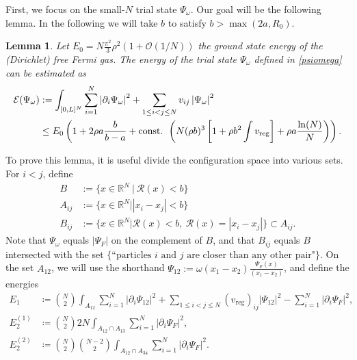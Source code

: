 \documentclass[a4paper,11pt]{article}
\newcommand{\abs}[1]{\left\lvert #1 \right\rvert}
\newcommand{\R}{\mathbb{R}}
\newcommand{\rr}{\mathcal{R}}
\newtheorem{lemma}[theorem]{Lemma}
\numberwithin{equation}{section}
\begin{document}
First, we focus on the small-$N$ trial state $\Psi_\omega$. Our goal will be the following lemma. In the following we will take $b$ to satisfy $b>\max(2a,R_0)$.
	\begin{lemma}
	\label{LemmaUpperBoundFewParticles}
	Let $E_0=N\frac{\pi^2}{3}\rho^2(1+\mathcal{O}(1/N)) $ the ground state energy of the (Dirichlet) free Fermi gas. The energy of the trial state $\Psi_\omega$ defined in \eqref{psiomega} can be estimated as 
	    \begin{equation}
	    \begin{aligned}
	        \mathcal{E}(\Psi_\omega)&:=\int_{[0,L]^N} \sum_{i=1}^{N}\abs{\partial_i\Psi_\omega}^2+\sum_{1\leq i<j\leq N}v_{ij}\abs{\Psi_\omega}^2\\
	        &\leq E_0\left(1+2\rho a\frac{b}{b-a}+\textnormal{const. } \left(N(\rho b)^3\left[1+\rho b^2\int v_\textnormal{reg}\right]+\rho a \frac{\ln(N)}{N}\right)\right).
	    \end{aligned}
	    \end{equation}
	\end{lemma}
To prove this lemma, it is useful divide the configuration space into various sets. For $i<j$, define 
\begin{equation}
\begin{aligned}
B&:=\{x\in\R^N\ \vert\ \mathcal{R}(x)<b \}\\
A_{ij}&:=\{x\in\R^N\vert \abs{x_i-x_j}<b\}\\
B_{ij}&:=\{x\in\R^N \vert \rr(x)<b,\ \rr(x)=\abs{x_i-x_j} \}\subset A_{ij}.
\end{aligned}
\end{equation}
Note that $ \Psi_\omega$ equals $\abs{\Psi_F} $ on the complement of $B$, and that $ B_{ij} $ equals $ B $ intersected with the set $ \{\text{``particles $i$ and $j$ are closer than any other pair"}\} $. On the set $A_{12}$, we will use the shorthand $\Psi_{12}:=\omega(x_1-x_2)\frac{\Psi_F(x)}{(x_1-x_2)}$, and define the energies
	\begin{equation}
	\begin{aligned}
	E_1&\coloneqq\binom{N}{2}\int_{A_{12}} \sum_{i=1}^{N}\abs{\partial_i\Psi_{12}}^2+\sum_{1\leq i<j\leq N}(v_{\text{reg}})_{ij}\abs{\Psi_{12}}^2-\sum_{i=1}^{N}\abs{\partial_i\Psi_F}^2, \\
	E_2^{(1)}&\coloneqq\binom{N}{2}2N\int_{A_{12}\cap A_{13}}\sum_{i=1}^{N}\abs{\partial_i\Psi_F}^2,\\ E_2^{(2)}&\coloneqq\binom{N}{2}\binom{N-2}{2}\int_{A_{12}\cap A_{34}}\sum_{i=1}^{N}\abs{\partial_i\Psi_F}^2.
	\end{aligned}
	\end{equation}
\end{document}
